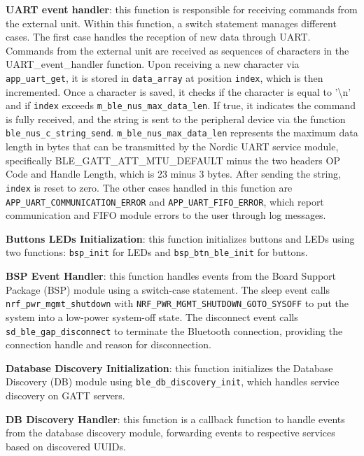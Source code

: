 \documentclass{Configuration_Files/PoliMi3i_thesis}
\begin{document}
\textbf{UART event handler}: this function is responsible for receiving commands from the external unit. Within this function, a switch statement manages different cases. The first case handles the reception of new data through UART. Commands from the external unit are received as sequences of characters in the UART\_event\_handler function. Upon receiving a new character via \texttt{app\_uart\_get}, it is stored in \texttt{data\_array} at position \texttt{index}, which is then incremented. Once a character is saved, it checks if the character is equal to '\textbackslash n' and if \texttt{index} exceeds \texttt{m\_ble\_nus\_max\_data\_len}. If true, it indicates the command is fully received, and the string is sent to the peripheral device via the function \texttt{ble\_nus\_c\_string\_send}. \texttt{m\_ble\_nus\_max\_data\_len} represents the maximum data length in bytes that can be transmitted by the Nordic UART service module, specifically BLE\_GATT\_ATT\_MTU\_DEFAULT minus the two headers OP Code and Handle Length, which is 23 minus 3 bytes. After sending the string, \texttt{index} is reset to zero. The other cases handled in this function are \texttt{APP\_UART\_COMMUNICATION\_ERROR} and \texttt{APP\_UART\_FIFO\_ERROR}, which report communication and FIFO module errors to the user through log messages.

\textbf{Buttons LEDs Initialization}: this function initializes buttons and LEDs using two functions: \texttt{bsp\_init} for LEDs and \texttt{bsp\_btn\_ble\_init} for buttons.


\textbf{BSP Event Handler}: this function handles events from the Board Support Package (BSP) module using a switch-case statement. The sleep event calls \texttt{nrf\_pwr\_mgmt\_shutdown} with \texttt{NRF\_PWR\_MGMT\_SHUTDOWN\_GOTO\_SYSOFF} to put the system into a low-power system-off state. The disconnect event calls \texttt{sd\_ble\_gap\_disconnect} to terminate the Bluetooth connection, providing the connection handle and reason for disconnection.

\textbf{Database Discovery Initialization}: this function initializes the Database Discovery (DB) module using \texttt{ble\_db\_discovery\_init}, which handles service discovery on GATT servers.

\textbf{DB Discovery Handler}: this function is a callback function to handle events from the database discovery module, forwarding events to respective services based on discovered UUIDs.
\end{document}

